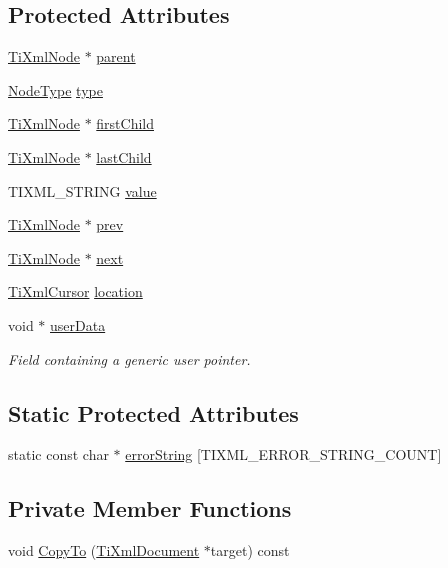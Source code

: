 \subsection*{Protected Attributes}
\begin{DoxyCompactItemize}
\item 
\hyperlink{classTiXmlNode}{TiXmlNode} $\ast$ \hyperlink{classTiXmlNode_a662c4de61244e4fa5bd4e2d8c63143a5}{parent}
\item 
\hyperlink{classTiXmlNode_a836eded4920ab9e9ef28496f48cd95a2}{NodeType} \hyperlink{classTiXmlNode_a2619c6379181c16ba95ae6922e2ca839}{type}
\item 
\hyperlink{classTiXmlNode}{TiXmlNode} $\ast$ \hyperlink{classTiXmlNode_af749fb7f22010b80e8f904c32653d50e}{firstChild}
\item 
\hyperlink{classTiXmlNode}{TiXmlNode} $\ast$ \hyperlink{classTiXmlNode_a5b30756d21b304580d22a841ec9d61f8}{lastChild}
\item 
TIXML\_\-STRING \hyperlink{classTiXmlNode_aead528b3cedc33c16a6c539872c7cc8b}{value}
\item 
\hyperlink{classTiXmlNode}{TiXmlNode} $\ast$ \hyperlink{classTiXmlNode_a9c5370ea2cbfd9f0e0f7b30a57fd68f5}{prev}
\item 
\hyperlink{classTiXmlNode}{TiXmlNode} $\ast$ \hyperlink{classTiXmlNode_a2f329cc993d2d34df76e17dcbb776b45}{next}
\item 
\hyperlink{structTiXmlCursor}{TiXmlCursor} \hyperlink{classTiXmlBase_a0d992580f3bc264909f898e942677a3c}{location}
\item 
void $\ast$ \hyperlink{classTiXmlBase_ab242c01590191f644569fa89a080d97c}{userData}
\begin{DoxyCompactList}\small\item\em Field containing a generic user pointer. \item\end{DoxyCompactList}\end{DoxyCompactItemize}
\subsection*{Static Protected Attributes}
\begin{DoxyCompactItemize}
\item 
static const char $\ast$ \hyperlink{classTiXmlBase_a7ac8feec4100e446b3d78e1ac0659700}{errorString} \mbox{[}TIXML\_\-ERROR\_\-STRING\_\-COUNT\mbox{]}
\end{DoxyCompactItemize}
\subsection*{Private Member Functions}
\begin{DoxyCompactItemize}
\item 
void \hyperlink{classTiXmlDocument_af69deeb984e060bd00f668460dec8ef2}{CopyTo} (\hyperlink{classTiXmlDocument}{TiXmlDocument} $\ast$target) const 
\end{DoxyCompactItemize}
